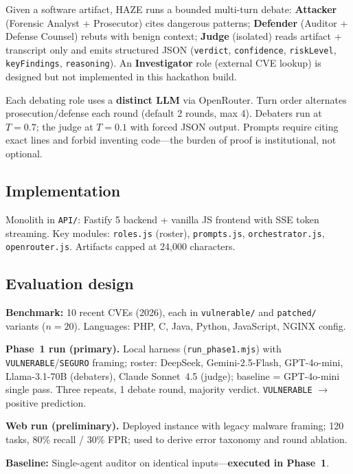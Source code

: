 \documentclass[10pt]{article}
\begin{document}
Given a software artifact, HAZE runs a bounded multi-turn debate:
\textbf{Attacker} (Forensic Analyst + Prosecutor) cites dangerous patterns;
\textbf{Defender} (Auditor + Defense Counsel) rebuts with benign context;
\textbf{Judge} (isolated) reads artifact + transcript only and emits structured JSON
(\texttt{verdict}, \texttt{confidence}, \texttt{riskLevel}, \texttt{keyFindings},
\texttt{reasoning}). An \textbf{Investigator} role (external CVE lookup) is designed but
not implemented in this hackathon build.

Each debating role uses a \textbf{distinct LLM} via OpenRouter. Turn order alternates
prosecution/defense each round (default 2 rounds, max 4). Debaters run at $T{=}0.7$;
the judge at $T{=}0.1$ with forced JSON output. Prompts require citing exact lines and
forbid inventing code---the burden of proof is institutional, not optional.

\subsection{Implementation}

Monolith in \texttt{API/}: Fastify 5 backend + vanilla JS frontend with SSE token
streaming. Key modules: \texttt{roles.js} (roster), \texttt{prompts.js},
\texttt{orchestrator.js}, \texttt{openrouter.js}. Artifacts capped at 24{,}000
characters.

\subsection{Evaluation design}

\textbf{Benchmark:} 10 recent CVEs (2026), each in \texttt{vulnerable/} and
\texttt{patched/} variants ($n{=}20$). Languages: PHP, C, Java, Python, JavaScript,
NGINX config.

\textbf{Phase~1 run (primary).} Local harness (\texttt{run\_phase1.mjs}) with
\texttt{VULNERABLE}/\texttt{SEGURO} framing; roster: DeepSeek, Gemini-2.5-Flash,
GPT-4o-mini, Llama-3.1-70B (debaters), Claude Sonnet~4.5 (judge); baseline =
GPT-4o-mini single pass. Three repeats, 1 debate round, majority verdict.
\texttt{VULNERABLE} $\rightarrow$ positive prediction.

\textbf{Web run (preliminary).} Deployed instance with legacy malware framing;
120 tasks, 80\% recall / 30\% FPR; used to derive error taxonomy and round ablation.

\textbf{Baseline:} Single-agent auditor on identical inputs---\textbf{executed in Phase~1}.
\end{document}
